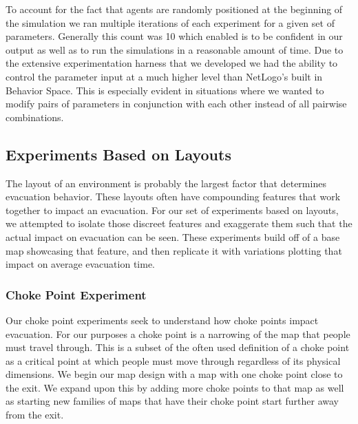 \documentclass[12pt,letterpaper]{article}
\begin{document}
To account for the fact that agents are randomly positioned at the beginning of the simulation we ran multiple iterations of each experiment for a given set of parameters.  Generally this count was 10 which enabled is to be confident in our output as well as to run the simulations in a reasonable amount of time.  Due to the extensive experimentation harness that we developed we had the ability to control the parameter input at a much higher level than NetLogo's built in Behavior Space.  This is especially evident in situations where we wanted to modify pairs of parameters in conjunction with each other instead of all pairwise combinations.


\subsection{Experiments Based on Layouts} \label{expLayout}

The layout of an environment is probably the largest factor that determines evacuation behavior.  These layouts often have compounding features that work together to impact an evacuation\cite{abmEvac}. For our set of experiments based on layouts, we attempted to isolate those discreet features and exaggerate them such that the actual impact on evacuation can be seen.  These experiments build off of a base map showcasing that feature, and then replicate it with variations plotting that impact on average evacuation time.


\subsubsection{Choke Point Experiment} \label{chokepoint}

Our choke point experiments seek to understand how choke points impact evacuation.  For our purposes a choke point is a narrowing of the map that people must travel through.  This is a subset of the often used definition of a choke point as a critical point at which people must move through\cite{evacOptions} regardless of its physical dimensions.  We begin our map design with a map with one choke point close to the exit.  We expand upon this by adding more choke points to that map as well as starting new families of maps that have their choke point start further away from the exit.
\end{document}
